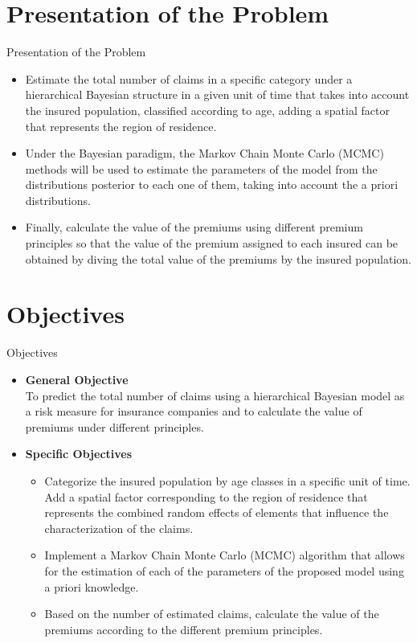 \documentclass[10pt]{beamer} %
\begin{document}

\section{Presentation of the Problem}
\begin{frame}{Presentation of the Problem}
\begin{itemize}
    \item Estimate the total number of claims in a specific category under a hierarchical Bayesian structure in a given unit of time that takes into account the insured population, classified according to age, adding a spatial factor that represents the region of residence. 
    \item Under the Bayesian paradigm, the Markov Chain Monte Carlo (MCMC) methods will be used to estimate the parameters of the model from the distributions posterior to each one of them, taking into account the a priori distributions.
    \item Finally, calculate the value of the premiums using different premium principles so that the value of the premium assigned to each insured can be obtained by diving the total value of the premiums by the insured population.
\end{itemize}
\end{frame}
\section{Objectives}
\begin{frame}{Objectives}
\begin{itemize}
    \item \textbf{General Objective}\\
    To predict the total number of claims using a hierarchical Bayesian model as a risk measure for insurance companies and to calculate the value of premiums under different principles.\\
    \item\textbf{Specific Objectives}
    \begin{itemize}
        \item Categorize the insured population by age classes in a specific unit of time. Add a spatial factor corresponding to the region of residence that represents the combined random effects of elements that influence the characterization of the claims.
	\item Implement a Markov Chain Monte Carlo (MCMC) algorithm that allows for the estimation of each of the parameters of the proposed model using a priori knowledge.
	\item Based on the number of estimated claims, calculate the value of the premiums according to the different premium principles. 
    \end{itemize}
\end{itemize}
\end{frame}
\end{document}
